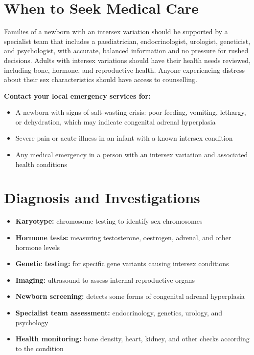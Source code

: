 \section*{When to Seek Medical Care}
Families of a newborn with an intersex variation should be supported by a specialist team that includes a paediatrician, endocrinologist, urologist, geneticist, and psychologist, with accurate, balanced information and no pressure for rushed decisions. Adults with intersex variations should have their health needs reviewed, including bone, hormone, and reproductive health. Anyone experiencing distress about their sex characteristics should have access to counselling.

\textbf{Contact your local emergency services for:}
\begin{itemize}
    \item A newborn with signs of salt-wasting crisis: poor feeding, vomiting, lethargy, or dehydration, which may indicate congenital adrenal hyperplasia
    \item Severe pain or acute illness in an infant with a known intersex condition
    \item Any medical emergency in a person with an intersex variation and associated health conditions
\end{itemize}

\section*{Diagnosis and Investigations}
\begin{itemize}
    \item \textbf{Karyotype:} chromosome testing to identify sex chromosomes
    \item \textbf{Hormone tests:} measuring testosterone, oestrogen, adrenal, and other hormone levels
    \item \textbf{Genetic testing:} for specific gene variants causing intersex conditions
    \item \textbf{Imaging:} ultrasound to assess internal reproductive organs
    \item \textbf{Newborn screening:} detects some forms of congenital adrenal hyperplasia
    \item \textbf{Specialist team assessment:} endocrinology, genetics, urology, and psychology
    \item \textbf{Health monitoring:} bone density, heart, kidney, and other checks according to the condition
\end{itemize}

